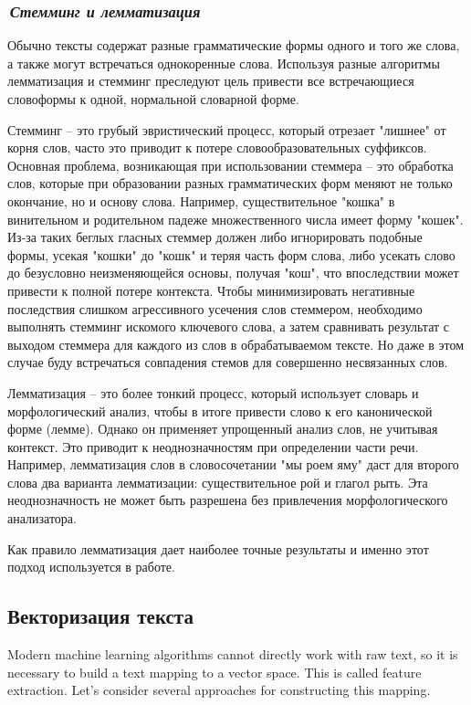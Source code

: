 \documentclass[12pt]{article}
\begin{document}
\subsubsection{\it\,Стемминг и лемматизация}
Обычно тексты содержат разные грамматические формы одного и того же слова, а также могут встречаться однокоренные слова. Используя разные алгоритмы лемматизация и стемминг преследуют цель привести все встречающиеся словоформы к одной, нормальной словарной форме.


Стемминг -- это грубый эвристический процесс, который отрезает "лишнее" от корня слов, часто это приводит к потере словообразовательных суффиксов. Основная проблема, возникающая при использовании стеммера -- это обработка слов, которые при образовании разных грамматических форм меняют не только окончание, но и основу слова. Например, существительное "кошка" в винительном и родительном падеже множественного числа имеет форму "кошек". Из-за таких беглых гласных стеммер должен либо игнорировать подобные формы, усекая "кошки" до "кошк" и теряя часть форм слова, либо усекать слово до безусловно неизменяющейся основы, получая "кош", что впоследствии может привести к полной потере контекста. Чтобы минимизировать негативные последствия слишком агрессивного усечения слов стеммером, необходимо выполнять стемминг искомого ключевого слова, а затем сравнивать результат с выходом стеммера для каждого из слов в обрабатываемом тексте. Но даже в этом случае буду встречаться совпадения стемов для совершенно несвязанных слов.


Лемматизация -- это более тонкий процесс, который использует словарь и морфологический анализ, чтобы в итоге привести слово к его канонической форме (лемме). Однако он применяет упрощенный анализ слов, не учитывая контекст. Это приводит к неоднозначностям при определении части речи. Например, лемматизация слов в словосочетании "мы роем яму" даст для второго слова два варианта лемматизации: существительное рой и глагол рыть. Эта неоднозначность не может быть разрешена без привлечения морфологического анализатора.

Как правило лемматизация дает наиболее точные результаты и именно этот подход используется в работе.

\subsection{Векторизация текста}
Modern machine learning algorithms cannot directly work with raw text, so it is necessary to build a text mapping to a vector space. This is called feature extraction. Let's consider several approaches for constructing this mapping.
\end{document}
